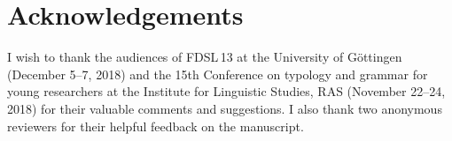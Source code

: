 \documentclass[output=paper]{langscibook}
\begin{document}
\section*{Acknowledgements}

I wish to thank the audiences of FDSL\,13 at the University of Göttingen (December 5--7, 2018) and the 15th Conference on typology and grammar for young researchers at the Institute for Linguistic Studies, RAS (November 22--24, 2018) for their valuable comments and suggestions. I also thank two anonymous reviewers for their helpful feedback on the manuscript.

{\sloppy\printbibliography[heading=subbibliography,notkeyword=this]}
\end{document}
